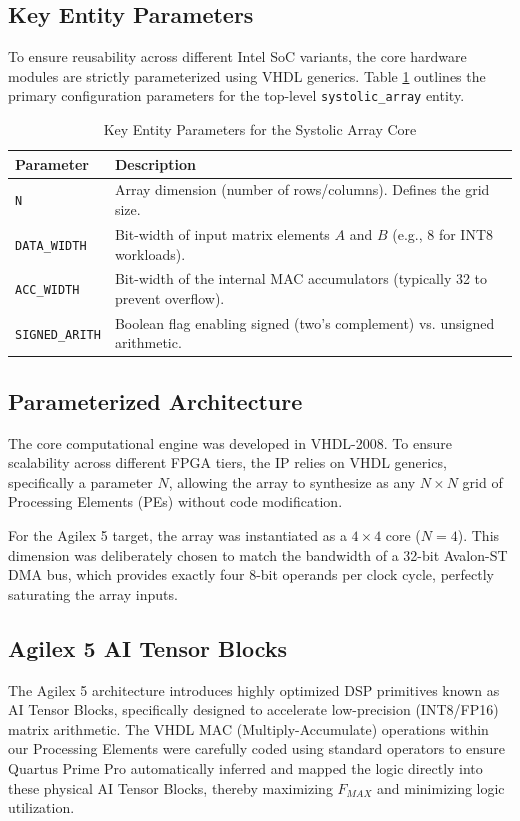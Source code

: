 \documentclass[12pt, letterpaper]{article}
\begin{document}
\subsection{Key Entity Parameters}
To ensure reusability across different Intel SoC variants, the core hardware modules are strictly parameterized using VHDL generics. Table \ref{tab:sa_generics} outlines the primary configuration parameters for the top-level \texttt{systolic\_array} entity.

\begin{table}[h]
\centering
\renewcommand{\arraystretch}{1.2}
\begin{tabular}{ll}
\toprule
\textbf{Parameter} & \textbf{Description} \\
\midrule
\texttt{N} & Array dimension (number of rows/columns). Defines the grid size. \\
\texttt{DATA\_WIDTH} & Bit-width of input matrix elements $A$ and $B$ (e.g., 8 for INT8 workloads). \\
\texttt{ACC\_WIDTH} & Bit-width of the internal MAC accumulators (typically 32 to prevent overflow). \\
\texttt{SIGNED\_ARITH} & Boolean flag enabling signed (two's complement) vs. unsigned arithmetic. \\
\bottomrule
\end{tabular}
\caption{Key Entity Parameters for the Systolic Array Core}
\label{tab:sa_generics}
\end{table}

\subsection{Parameterized Architecture}
The core computational engine was developed in VHDL-2008. To ensure scalability across different FPGA tiers, the IP relies on VHDL generics, specifically a parameter $N$, allowing the array to synthesize as any $N \times N$ grid of Processing Elements (PEs) without code modification. 

For the Agilex 5 target, the array was instantiated as a $4 \times 4$ core ($N=4$). This dimension was deliberately chosen to match the bandwidth of a 32-bit Avalon-ST DMA bus, which provides exactly four 8-bit operands per clock cycle, perfectly saturating the array inputs.

\subsection{Agilex 5 AI Tensor Blocks}
The Agilex 5 architecture introduces highly optimized DSP primitives known as AI Tensor Blocks, specifically designed to accelerate low-precision (INT8/FP16) matrix arithmetic. The VHDL MAC (Multiply-Accumulate) operations within our Processing Elements were carefully coded using standard operators to ensure Quartus Prime Pro automatically inferred and mapped the logic directly into these physical AI Tensor Blocks, thereby maximizing $F_{MAX}$ and minimizing logic utilization.
\end{document}
